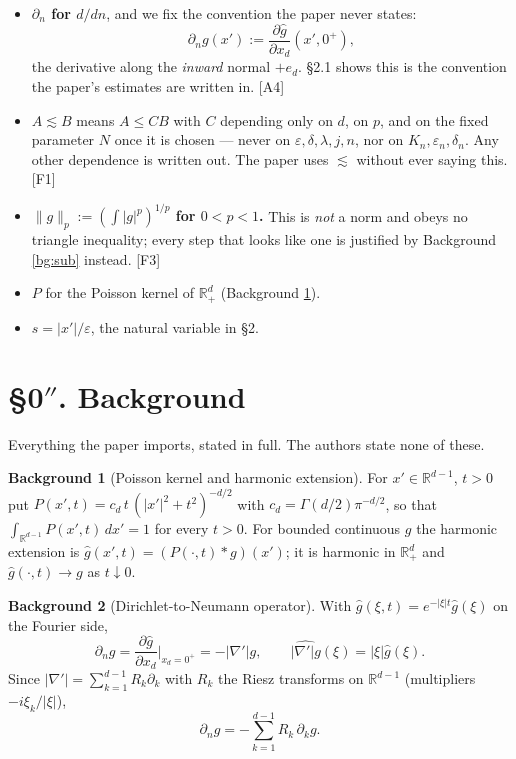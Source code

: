 \documentclass[11pt,reqno]{amsart}
\theoremstyle{plain}
\theoremstyle{definition}
\newtheorem*{bg}{Background}
\theoremstyle{plain}
\theoremstyle{definition}
\theoremstyle{remark}
\newcommand{\Rd}{\mathbb{R}^d_+}
\newcommand{\Rdm}{\mathbb{R}^{d-1}}
\newcommand{\nd}{\partial_n}
\newcommand{\he}[1]{\widehat{#1}}
\newcommand{\Ledger}[1]{{\scriptsize\textsf{[#1]}}}
\begin{document}
\begin{ournotation}
\begin{itemize}[leftmargin=1.6em,itemsep=1pt]
\item \textbf{$\nd$ for $d/dn$}, and we fix the convention the paper never states:
  \[\nd g(x'):=\frac{\partial \he g}{\partial x_d}(x',0^+),\]
  the derivative along the \emph{inward} normal $+e_d$. \S2.1 shows this is the
  convention the paper's estimates are written in. \Ledger{A4}
\item \textbf{$A\lesssim B$} means $A\le CB$ with $C$ depending only on $d$, on $p$,
  and on the fixed parameter $N$ once it is chosen --- never on
  $\varepsilon,\delta,\lambda,j,n$, nor on $K_n,\varepsilon_n,\delta_n$. Any other
  dependence is written out. The paper uses $\lesssim$ without ever saying this.
  \Ledger{F1}
\item \textbf{$\|g\|_p:=(\int|g|^p)^{1/p}$ for $0<p<1$.} This is \emph{not} a norm
  and obeys no triangle inequality; every step that looks like one is justified by
  Background \ref{bg:sub} instead. \Ledger{F3}
\item \textbf{$P$} for the Poisson kernel of $\Rd$ (Background \ref{bg:poisson}).
\item \textbf{$s=|x'|/\varepsilon$}, the natural variable in \S2.
\end{itemize}
\end{ournotation}

\section*{\S0$''$. Background}

Everything the paper imports, stated in full. The authors state none of these.

\begin{bg}[Poisson kernel and harmonic extension]\label{bg:poisson}
For $x'\in\Rdm$, $t>0$ put
$P(x',t)=c_d\,t\,(|x'|^2+t^2)^{-d/2}$ with $c_d=\Gamma(d/2)\pi^{-d/2}$, so that
$\int_{\Rdm}P(x',t)\,dx'=1$ for every $t>0$. For bounded continuous $g$ the
harmonic extension is $\he g(x',t)=(P(\cdot,t)*g)(x')$; it is harmonic in $\Rd$ and
$\he g(\cdot,t)\to g$ as $t\downarrow0$.
\end{bg}

\begin{bg}[Dirichlet-to-Neumann operator]\label{bg:dtn}
With $\he{g}(\xi,t)=e^{-|\xi|t}\hat g(\xi)$ on the Fourier side,
\[\nd g=\frac{\partial \he g}{\partial x_d}\Big|_{x_d=0^+}=-|\nabla'|g,
  \qquad \widehat{|\nabla'|g}(\xi)=|\xi|\hat g(\xi).\]
Since $|\nabla'|=\sum_{k=1}^{d-1}R_k\partial_k$ with $R_k$ the Riesz transforms on
$\Rdm$ (multipliers $-i\xi_k/|\xi|$),
\begin{equation}\label{eq:dtn}
  \nd g=-\sum_{k=1}^{d-1}R_k\,\partial_k g .
\end{equation}
\end{bg}
\end{document}
